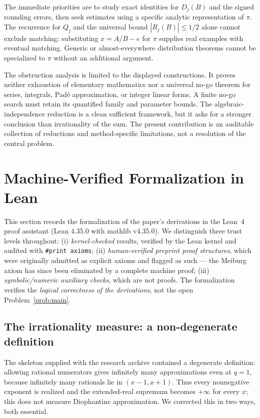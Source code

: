 \documentclass[11pt]{amsart}
\theoremstyle{definition}
\theoremstyle{remark}
\numberwithin{equation}{section}
\begin{document}
The immediate priorities are to study exact identities for $D_j(B)$ and the signed rounding errors, then seek estimates using a specific analytic representation of $\pi$. The recurrence for $Q_j$ and the universal bound $|R_j(B)|\le1/2$ alone cannot exclude matching: substituting $x=A/B-e$ for $\pi$ supplies real examples with eventual matching. Generic or almost-everywhere distribution theorems cannot be specialized to $\pi$ without an additional argument.

The obstruction analysis is limited to the displayed constructions. It proves neither exhaustion of elementary mathematics nor a universal no-go theorem for series, integrals, Pad\'e approximation, or integer linear forms. A finite no-go search must retain its quantified family and parameter bounds. The algebraic-independence reduction is a clean sufficient framework, but it asks for a stronger conclusion than irrationality of the sum. The present contribution is an auditable collection of reductions and method-specific limitations, not a resolution of the central problem.

\section{Machine-Verified Formalization in Lean}\label{sec:lean}

This section records the formalization of the paper's derivations in the Lean~4 proof assistant (Lean 4.35.0 with mathlib v4.35.0). We distinguish three trust levels throughout: (i) \emph{kernel-checked} results, verified by the Lean kernel and audited with \texttt{\#print axioms}; (ii) \emph{human-verified preprint proof structures}, which were originally admitted as explicit axioms and flagged as such --- the Meiburg axiom has since been eliminated by a complete machine proof; (iii) \emph{symbolic/numeric auxiliary checks}, which are not proofs. The formalization verifies the \emph{logical correctness of the derivations}, not the open Problem~\ref{prob:main}.

\subsection{The irrationality measure: a non-degenerate definition}\label{sec:lean-def}

The skeleton supplied with the research archive contained a degenerate definition: allowing rational numerators gives infinitely many approximations even at $q=1$, because infinitely many rationals lie in $(x-1,x+1)$. Thus every nonnegative exponent is realized and the extended-real supremum becomes $+\infty$ for every $x$; this does not measure Diophantine approximation. We corrected this in two ways, both essential.
\end{document}

